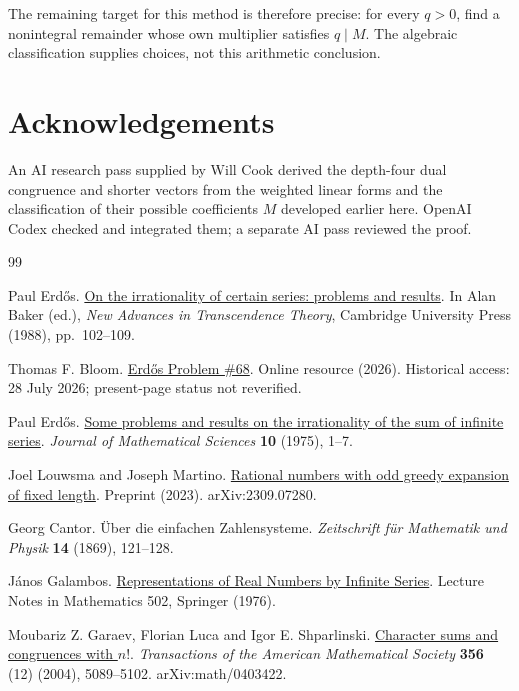 \documentclass[11pt]{article}
\begin{document}
The remaining target for this method is therefore precise: for every
$q>0$, find a nonintegral remainder whose own multiplier satisfies
$q\mid M$. The algebraic classification supplies choices, not this
arithmetic conclusion.

\section*{Acknowledgements}

An AI research pass supplied by Will Cook derived the depth-four dual
congruence and shorter vectors from the weighted linear forms and the
classification of their possible coefficients $M$ developed earlier here. OpenAI Codex
checked and integrated them; a separate AI pass reviewed the proof.

\begin{thebibliography}{99}

Paul Erd{\H o}s. \href{https://doi.org/10.1017/CBO9780511897184.009}{On the irrationality of certain series: problems and results}.
In Alan Baker (ed.), \emph{New Advances in Transcendence Theory}, Cambridge University Press (1988), pp.~102--109.

Thomas F. Bloom. \href{https://www.erdosproblems.com/68}{Erd{\H o}s Problem {\#68}}.
Online resource (2026). Historical access: 28 July 2026; present-page status not reverified.

Paul Erd{\H o}s. \href{https://www.renyi.hu/~p_erdos/1976-44.pdf}{Some problems and results on the irrationality of the sum of infinite series}.
\emph{Journal of Mathematical Sciences} \textbf{10} (1975), 1--7.

Joel Louwsma and Joseph Martino. \href{https://arxiv.org/abs/2309.07280v1}{Rational numbers with odd greedy expansion of fixed length}.
Preprint (2023). arXiv:2309.07280.

Georg Cantor. {\"U}ber die einfachen Zahlensysteme.
\emph{Zeitschrift f{\"u}r Mathematik und Physik} \textbf{14} (1869), 121--128.

J{\'a}nos Galambos. \href{https://doi.org/10.1007/BFb0081642}{Representations of Real Numbers by Infinite Series}.
Lecture Notes in Mathematics 502, Springer (1976).

Moubariz Z. Garaev, Florian Luca and Igor E. Shparlinski. \href{https://doi.org/10.1090/S0002-9947-04-03612-8}{Character sums and congruences with {$n!$}}.
\emph{Transactions of the American Mathematical Society} \textbf{356} (12) (2004), 5089--5102. arXiv:math/0403422.


\end{thebibliography}
\end{document}
